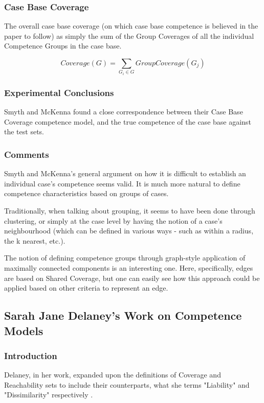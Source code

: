 \documentclass[a4paper,11pt]{report}
\begin{document}
\subsubsection{Case Base Coverage}
The overall case base coverage (on which case base competence is believed in the paper to follow) as simply the sum of the Group Coverages of all the individual Competence Groups in the case base.

\[
Coverage(G)=\underset{G_{i}\in G}{\sum}GroupCoverage(G_{j})
\]

\subsubsection{Experimental Conclusions}
Smyth and McKenna found a close correspondence between their Case Base Coverage competence model, and the true competence of the case base against the test sets\cite{Smyth1998}.

\subsubsection{Comments}
Smyth and McKenna's general argument on how it is difficult to establish an individual case's competence seems valid. It is much more natural to define competence characteristics based on groups of cases. 

Traditionally, when talking about grouping, it seems to have been done through clustering, or simply at the case level by having the notion of a case's neighbourhood (which can be defined in various ways - such as within a radius, the k nearest, etc.).

The notion of defining competence groups through graph-style application of maximally connected components is an interesting one. Here, specifically, edges are based on Shared Coverage, but one can easily see how this approach could be applied based on other criteria to represent an edge.

\subsection{Sarah Jane Delaney's Work on Competence Models\label{sec:DelaneysWork}}
\subsubsection{Introduction}
Delaney, in her work, expanded upon the definitions of Coverage and Reachability sets to include their counterparts, what she terms "Liability" and "Dissimilarity" respectively \cite{Delany2009}. 
\end{document}
